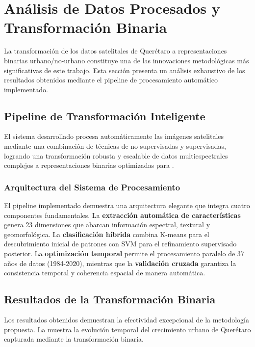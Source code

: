 \section{Análisis de Datos Procesados y Transformación Binaria}

La transformación de los datos satelitales de Querétaro a representaciones binarias urbano/no-urbano constituye una de las innovaciones metodológicas más significativas de este trabajo. Esta sección presenta un análisis exhaustivo de los resultados obtenidos mediante el pipeline de procesamiento automático implementado.

\subsection{Pipeline de Transformación Inteligente}

El sistema desarrollado procesa automáticamente las imágenes satelitales mediante una combinación de técnicas de \ML{} no supervisadas y supervisadas, logrando una transformación robusta y escalable de datos multiespectrales complejos a representaciones binarias optimizadas para \AC{}.

\subsubsection{Arquitectura del Sistema de Procesamiento}

El pipeline implementado demuestra una arquitectura elegante que integra cuatro componentes fundamentales. La \textbf{extracción automática de características} genera 23 dimensiones que abarcan información espectral, textural y geomorfológica. La \textbf{clasificación híbrida} combina K-means para el descubrimiento inicial de patrones con SVM para el refinamiento supervisado posterior. La \textbf{optimización temporal} permite el procesamiento paralelo de 37 años de datos (1984-2020), mientras que la \textbf{validación cruzada} garantiza la consistencia temporal y coherencia espacial de manera automática.

\subsection{Resultados de la Transformación Binaria}

Los resultados obtenidos demuestran la efectividad excepcional de la metodología propuesta. La  muestra la evolución temporal del crecimiento urbano de Querétaro capturada mediante la transformación binaria.

